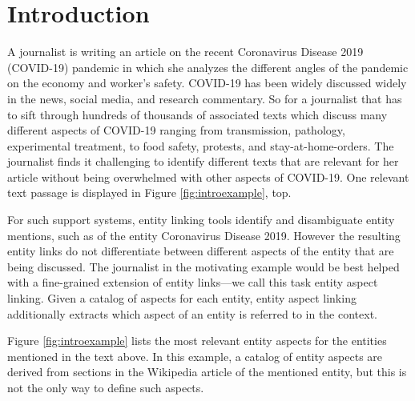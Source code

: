 \section{Introduction}
\label{sec:Introduction}




A journalist is writing an article on the recent Coronavirus Disease 2019 (COVID-19)
pandemic in which she analyzes the different angles of the pandemic on the economy and worker's safety. COVID-19 has been widely discussed widely in the news, social media, and research commentary. So for a journalist that has to sift through hundreds of thousands of associated texts  which discuss many different aspects of COVID-19 ranging from transmission, pathology, experimental treatment, to food safety, protests, and stay-at-home-orders. The journalist finds it challenging to identify different texts that are relevant for her article without being overwhelmed with other aspects of COVID-19. One relevant text passage is displayed in Figure \ref{fig:introexample}, top. 





For such support systems, entity linking tools \cite{ferragina2010tagme,mendes2011dbpedia,piccinno2014wat} identify and disambiguate entity mentions, such as of the entity Coronavirus Disease 2019. However the resulting entity links do not differentiate between different aspects of the entity that are being discussed. The journalist in the motivating example would be best helped with a fine-grained extension of entity links---we call this task entity aspect linking. Given a catalog of aspects for each entity, entity aspect linking  additionally extracts which aspect of an entity is referred to in the context. 

 Figure \ref{fig:introexample} lists the most relevant entity aspects for the entities mentioned in the text above.  In this example, a catalog of entity aspects are derived from sections in the Wikipedia article of the mentioned entity, but this is not the only way to define such aspects. 



